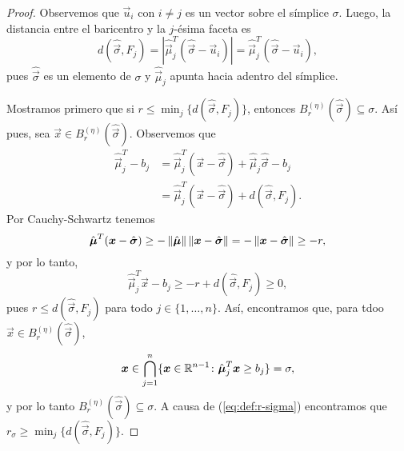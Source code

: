 \begin{proof}
	Observemos que $\vec{u}_i$ con $i \neq j$ es un vector sobre el símplice $\sigma$. Luego, la
	distancia entre el baricentro y la $j$-ésima faceta es
	\begin{equation*}
		d(\hat{\vec{\sigma}}, F_j) = |\hat{\vec{\mu}}_j^T(\hat{\vec{\sigma}} - \vec{u}_i)|
		= \hat{\vec{\mu}}_j^T(\hat{\vec{\sigma}} - \vec{u}_i),
	\end{equation*}
	pues $\hat{\vec{\sigma}}$ es un elemento de $\sigma$ y $\hat{\vec{\mu}}_j$ apunta hacia adentro
	del símplice.

	Mostramos primero que si $r \leq \min_{j} \lbrace d(\hat{\vec{\sigma}}, F_j) \rbrace$, entonces
	$B_r^{(\eta)}(\hat{\vec{\sigma}}) \subseteq \sigma$. Así pues, sea $\vec{x} \in
	B_r^{(\eta)}(\hat{\vec{\sigma}})$. Observemos que
	\begin{align*}
		\hat{\vec{\mu}}_j^T - b_j
		&=
		\hat{\vec{\mu}}_j^T(\vec{x} - \hat{\vec{\sigma}}) + \hat{\vec{\mu}}_j\hat{\vec{\sigma}} -
		b_j \\
		&= \hat{\vec{\mu}}_j^T(\vec{x} - \hat{\vec{\sigma}}) + d(\hat{\vec{\sigma}}, F_j).
	\end{align*}
	Por Cauchy-Schwartz tenemos
	\begin{equation*}
		\hat{\boldsymbol{\mu}}^T(\boldsymbol{x} - \hat{\boldsymbol{\sigma}})
		\geq -\left\lVert \hat{\boldsymbol{\mu}} \right\rVert\left\lVert \boldsymbol{x} - \hat{\boldsymbol{\sigma}} \right\rVert
		= -\left\lVert \boldsymbol{x} - \hat{\boldsymbol{\sigma}} \right\rVert
		\geq -r,
	\end{equation*}
	y por lo tanto,
	\begin{equation*}
		\hat{\vec{\mu}}_j^T\vec{x} - b_j \geq -r + d(\hat{\vec{\sigma}}, F_j) \geq 0,
	\end{equation*}
	pues $r \leq d(\hat{\vec{\sigma}}, F_j)$ para todo $j \in \lbrace 1, \ldots, n \rbrace$. Así,
	encontramos que, para tdoo $\vec{x} \in B_r^{(\eta)}(\hat{\vec{\sigma}})$,
	\begin{equation*}
		\boldsymbol{x} \in
		\bigcap_{j=1}^{n} \lbrace \boldsymbol{x} \in \mathbb{R}^{n-1} \colon \hat{\boldsymbol{\mu}}^T_j\boldsymbol{x} \geq b_j \rbrace
		= \sigma,
	\end{equation*}
	y por lo tanto $B_r^{(\eta)}(\hat{\vec{\sigma}}) \subseteq \sigma$. A causa de
	(\ref{eq:def:r-sigma}) encontramos que $r_\sigma \geq \min_{j} \lbrace d(\hat{\vec{\sigma}},
	F_j) \rbrace$.


\end{proof}
